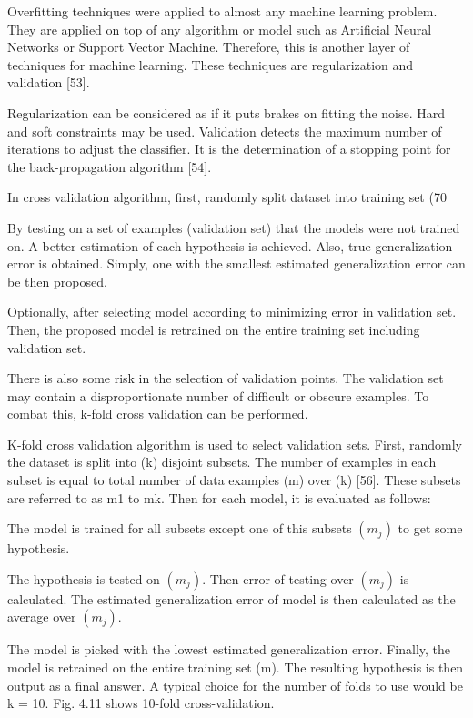 Overfitting techniques were applied to almost any machine learning problem. They are applied on top of any algorithm or model such as Artificial Neural Networks or Support Vector Machine. Therefore, this is another layer of techniques for machine learning. These techniques are regularization and validation [53]. 

Regularization can be considered as if it puts brakes on fitting the noise. Hard and soft constraints may be used. Validation detects the maximum number of iterations to adjust the classifier. It is the determination of a stopping point for the back-propagation algorithm [54].

In cross validation algorithm, first, randomly split dataset into training set (70%
 
By testing on a set of examples (validation set) that the models were not trained on. A better estimation of each hypothesis is achieved. Also, true generalization error is obtained. Simply, one with the smallest estimated generalization error can be then proposed.

Optionally, after selecting model according to minimizing error in validation set. Then, the proposed model is retrained on the entire training set including validation set. 

There is also some risk in the selection of validation points. The validation set may contain a disproportionate number of difficult or obscure examples. To combat this,
k-fold cross validation can be performed.

K-fold cross validation algorithm is used to select validation sets. First, randomly the dataset is split into (k) disjoint subsets. The number of examples in each subset is equal to total number of data examples (m) over (k) [56]. These subsets are referred to as m1 to mk. Then for each model, it is evaluated as follows:

The model is trained for all subsets except one of this subsets $(m_j)$ to get some hypothesis.

The hypothesis is tested on $(m_j)$. Then error of testing over $(m_j)$ is calculated. The estimated generalization error of model is then calculated as the average over $(m_j)$.

The model is picked with the lowest estimated generalization error. Finally, the model is retrained on the entire training set (m). The resulting hypothesis is then output as a final answer. A typical choice for the number of folds to use would be k = 10. Fig. 4.11 shows 10-fold cross-validation.

